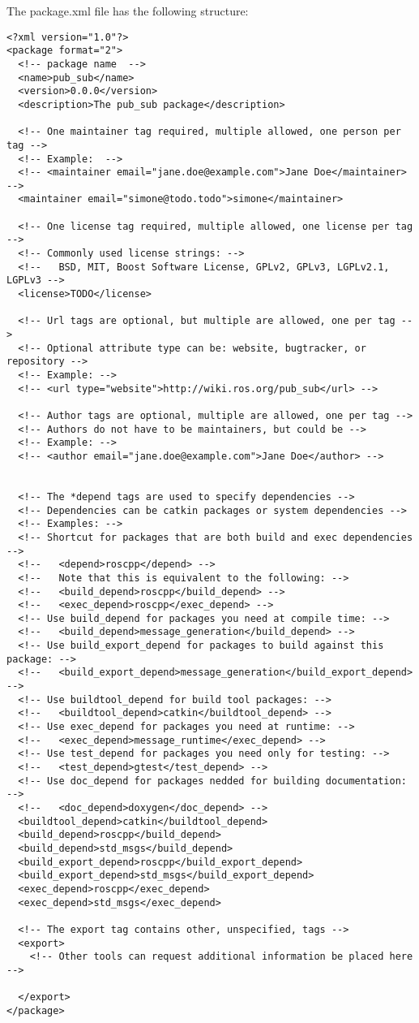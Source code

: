 The package.xml file has the following structure: 
\begin{verbatim}
<?xml version="1.0"?>
<package format="2">
  <!-- package name  -->
  <name>pub_sub</name>
  <version>0.0.0</version>
  <description>The pub_sub package</description>

  <!-- One maintainer tag required, multiple allowed, one person per tag -->
  <!-- Example:  -->
  <!-- <maintainer email="jane.doe@example.com">Jane Doe</maintainer> -->
  <maintainer email="simone@todo.todo">simone</maintainer>

  <!-- One license tag required, multiple allowed, one license per tag -->
  <!-- Commonly used license strings: -->
  <!--   BSD, MIT, Boost Software License, GPLv2, GPLv3, LGPLv2.1, LGPLv3 -->
  <license>TODO</license>

  <!-- Url tags are optional, but multiple are allowed, one per tag -->
  <!-- Optional attribute type can be: website, bugtracker, or repository -->
  <!-- Example: -->
  <!-- <url type="website">http://wiki.ros.org/pub_sub</url> -->

  <!-- Author tags are optional, multiple are allowed, one per tag -->
  <!-- Authors do not have to be maintainers, but could be -->
  <!-- Example: -->
  <!-- <author email="jane.doe@example.com">Jane Doe</author> -->


  <!-- The *depend tags are used to specify dependencies -->
  <!-- Dependencies can be catkin packages or system dependencies -->
  <!-- Examples: -->
  <!-- Shortcut for packages that are both build and exec dependencies -->
  <!--   <depend>roscpp</depend> -->
  <!--   Note that this is equivalent to the following: -->
  <!--   <build_depend>roscpp</build_depend> -->
  <!--   <exec_depend>roscpp</exec_depend> -->
  <!-- Use build_depend for packages you need at compile time: -->
  <!--   <build_depend>message_generation</build_depend> -->
  <!-- Use build_export_depend for packages to build against this package: -->
  <!--   <build_export_depend>message_generation</build_export_depend> -->
  <!-- Use buildtool_depend for build tool packages: -->
  <!--   <buildtool_depend>catkin</buildtool_depend> -->
  <!-- Use exec_depend for packages you need at runtime: -->
  <!--   <exec_depend>message_runtime</exec_depend> -->
  <!-- Use test_depend for packages you need only for testing: -->
  <!--   <test_depend>gtest</test_depend> -->
  <!-- Use doc_depend for packages nedded for building documentation: -->
  <!--   <doc_depend>doxygen</doc_depend> -->
  <buildtool_depend>catkin</buildtool_depend>
  <build_depend>roscpp</build_depend>
  <build_depend>std_msgs</build_depend>
  <build_export_depend>roscpp</build_export_depend>
  <build_export_depend>std_msgs</build_export_depend>
  <exec_depend>roscpp</exec_depend>
  <exec_depend>std_msgs</exec_depend>

  <!-- The export tag contains other, unspecified, tags -->
  <export>
    <!-- Other tools can request additional information be placed here -->

  </export>
</package>
\end{verbatim}
